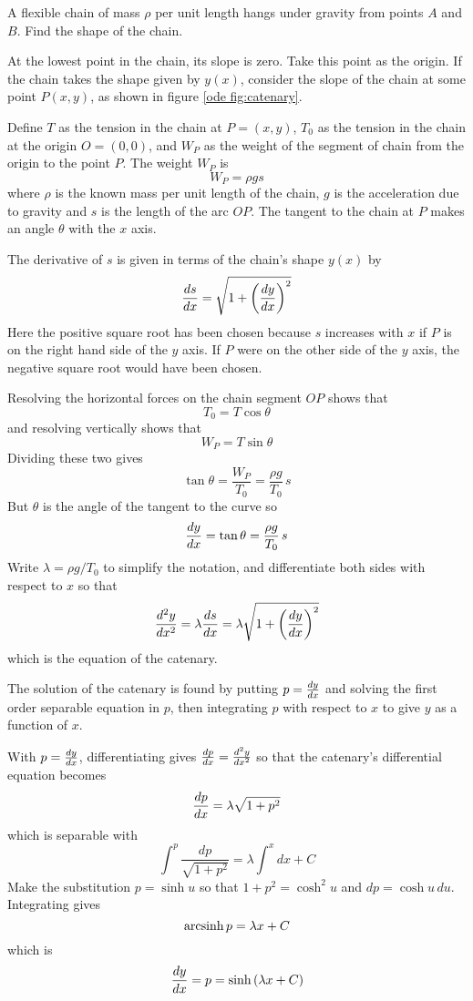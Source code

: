 \begin{example}
\label{ode exam:catenary}

\problem
A flexible chain of mass $\rho$ per unit length hangs under gravity from
points $A$ and $B$.  Find the shape of the chain.

\solution
At the lowest point in the chain, its slope is zero.  Take this point as the
origin.  If the chain takes the shape given by $y(x)$, consider the slope of
the chain at some point $P(x,y)$, as shown in figure \ref{ode fig:catenary}.


Define $T$ as the tension in the chain at $P=(x,y)$, $T_0$ as the tension in
the chain at the origin $O=(0,0)$, and $W_P$ as the weight of the segment of 
chain from the origin to the point $P$.  The weight $W_P$ is
$$W_P=\rho g s$$
where $\rho$ is the known mass per unit length of the chain, $g$ is the
acceleration due to gravity and $s$ is the length of the arc $OP$.
The tangent to the chain at $P$ makes an angle $\theta$ with the $x$ axis.

The derivative of $s$ is given in terms of the chain's shape $y(x)$ by
$$\frac{ds}{dx}=\sqrt{1+\left(\frac{dy}{dx}\right)^2}$$
Here the positive square root has been chosen because $s$ increases with $x$
if $P$ is on the right hand side of the $y$ axis.  If $P$ were on the other
side of the $y$ axis, the negative square root would have been chosen.

Resolving the horizontal forces on the chain segment $OP$ shows that
$$T_0=T\cos\theta$$
and resolving vertically shows that
$$W_P=T\sin\theta$$
Dividing these two gives
$$\tan\theta=\frac{W_P}{T_0}=\frac{\rho g}{T_0}\,s$$
But $\theta$ is the angle of the tangent to the curve so
$$\frac{dy}{dx}=\tan\theta=\frac{\rho g}{T_0}\,s$$
Write $\lambda=\rho g/T_0$ to simplify the notation, and differentiate both
sides with respect to $x$ so that
$$\frac{d^2y}{d{x}^2}=\lambda \frac{ds}{dx}=\lambda\sqrt{1+\left(\frac{dy}{dx}\right)^2}$$
which is the equation of the catenary.

The solution of the catenary is found by putting $p=\frac{dy}{dx}$ and solving
the first order separable equation in $p$, then integrating $p$ with respect
to $x$ to give $y$ as a function of $x$.

With $p=\frac{dy}{dx}$, differentiating gives $\frac{dp}{dx}=\frac{d^2y}{d{x}^2}$ so that
the catenary's differential equation becomes
$$\frac{dp}{dx}=\lambda\sqrt{1+p^2}$$
which is separable with
$$\int^p\frac{dp}{\sqrt{1+p^2}}=\lambda\int^x dx+C$$
Make the substitution $p=\sinh u$ so that $1+p^2=\cosh^2 u$ and $dp=\cosh
u\,du$.  Integrating gives
$$\operatorname{arcsinh} p=\lambda x +C$$
which is
$$\frac{dy}{dx}=p=\sinh\left(\lambda x+C\right)$$


\end{example}
